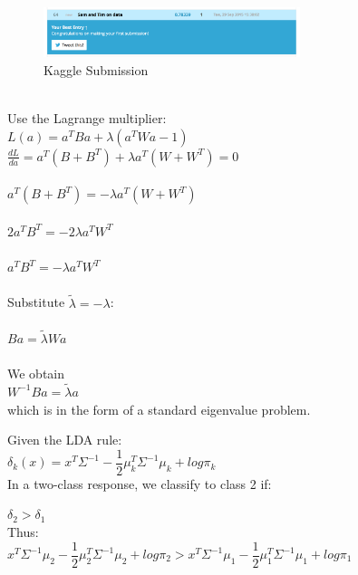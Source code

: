 \documentclass[12pt]{report}
\begin{document}
\begin{figure}
\centering
  \includegraphics[width=75mm]{figures/kaggle.png}
\caption{Kaggle Submission}
\end{figure}

\hspace{3mm}

\newpage
{}
\\
Use the Lagrange multiplier:\\
$L(a) = a^TBa + \lambda(a^TWa-1)$\\
$\frac{dL}{da} = a^T(B+B^T) + \lambda a^T(W+W^T) = 0$\\\\
$a^T(B+B^T) = -\lambda a^T(W+W^T)$\\\\
$2a^TB^T=-2\lambda a^TW^T$\\\\
$a^TB^T = -\lambda a^TW^T$\\\\
Substitute $\widetilde{\lambda} = -\lambda$:\\\\
$Ba = \widetilde{\lambda}Wa$\\\\
We obtain\\
$W^{-1}Ba = \widetilde{\lambda}a$\\
which is in the form of a standard eigenvalue problem.

\hspace{3mm}

\newpage
{}

Given the LDA rule:\\

$\delta_k (x) = x^T \Sigma ^{-1} - \dfrac{1}{2}\mu_k ^T \Sigma ^{-1} \mu_k + log \pi_k$\\

In a two-class response, we classify to class 2 if:

$\delta_2 > \delta_1$ \\

Thus: \\

$x^T \Sigma^{-1} \mu_2  - \dfrac{1}{2}\mu_2 ^T \Sigma ^{-1} \mu_2 + log \pi_2  > x^T \Sigma^{-1} \mu_1 - \dfrac{1}{2}\mu_1 ^T \Sigma ^{-1} \mu_1 + log \pi_1$\\
\end{document}
